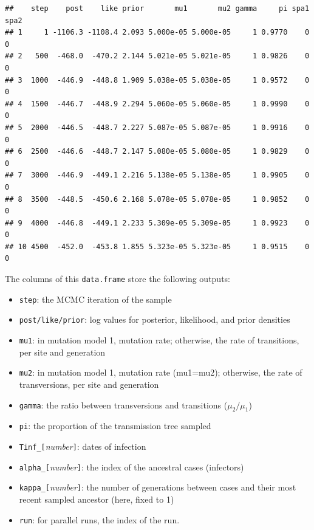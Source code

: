\documentclass{article}\usepackage[]{graphicx}\usepackage[]{color}
\makeatletter
\newenvironment{kframe}{%
 \def\at@end@of@kframe{}%
 \ifinner\ifhmode%
  \def\at@end@of@kframe{\end{minipage}}%
  \begin{minipage}{\columnwidth}%
 \fi\fi%
 \def\FrameCommand##1{\hskip\@totalleftmargin \hskip-\fboxsep
 \colorbox{shadecolor}{##1}\hskip-\fboxsep
     \hskip-\linewidth \hskip-\@totalleftmargin \hskip\columnwidth}%
 \MakeFramed {\advance\hsize-\width
   \@totalleftmargin\z@ \linewidth\hsize
   \@setminipage}}%
 {\par\unskip\endMakeFramed%
 \at@end@of@kframe}
\newenvironment{knitrout}{}{} %
\makeatother
\begin{document}
\begin{knitrout}
\begin{kframe}
\begin{alltt}
\end{alltt}
\begin{verbatim}
##    step    post    like prior       mu1       mu2 gamma     pi spa1 spa2
## 1     1 -1106.3 -1108.4 2.093 5.000e-05 5.000e-05     1 0.9770    0    0
## 2   500  -468.0  -470.2 2.144 5.021e-05 5.021e-05     1 0.9826    0    0
## 3  1000  -446.9  -448.8 1.909 5.038e-05 5.038e-05     1 0.9572    0    0
## 4  1500  -446.7  -448.9 2.294 5.060e-05 5.060e-05     1 0.9990    0    0
## 5  2000  -446.5  -448.7 2.227 5.087e-05 5.087e-05     1 0.9916    0    0
## 6  2500  -446.6  -448.7 2.147 5.080e-05 5.080e-05     1 0.9829    0    0
## 7  3000  -446.9  -449.1 2.216 5.138e-05 5.138e-05     1 0.9905    0    0
## 8  3500  -448.5  -450.6 2.168 5.078e-05 5.078e-05     1 0.9852    0    0
## 9  4000  -446.8  -449.1 2.233 5.309e-05 5.309e-05     1 0.9923    0    0
## 10 4500  -452.0  -453.8 1.855 5.323e-05 5.323e-05     1 0.9515    0    0
\end{verbatim}
\end{kframe}
\end{knitrout}

The columns of this \texttt{data.frame} store the following outputs:
\begin{itemize}
  \item \texttt{step}: the MCMC iteration of the sample
  \item \texttt{post/like/prior}: log values for posterior, likelihood, and prior densities
  \item \texttt{mu1}: in mutation model 1, mutation rate; otherwise, the rate of transitions, per site and generation
  \item \texttt{mu2}: in mutation model 1, mutation rate (mu1=mu2); otherwise, the rate of transversions, per site and generation
  \item \texttt{gamma}: the ratio between transversions and transitions ($\mu_2 / \mu_1$)
  \item \texttt{pi}: the proportion of the transmission tree sampled
  \item \texttt{Tinf\_[}\textit{number}\texttt{]}: dates of infection
  \item \texttt{alpha\_[}\textit{number}\texttt{]}: the index of the ancestral cases (infectors)
  \item \texttt{kappa\_[}\textit{number}\texttt{]}: the number of generations between cases and
    their most recent sampled ancestor (here, fixed to 1)
  \item \texttt{run}: for parallel runs, the index of the run.
\end{itemize}
\end{document}
